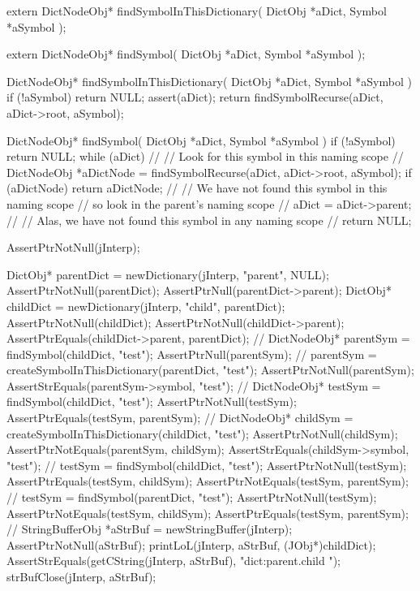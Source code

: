 \startTestSuite[findSymbol]

\startCHeader
extern DictNodeObj* findSymbolInThisDictionary(
  DictObj *aDict,
  Symbol  *aSymbol
);

extern DictNodeObj* findSymbol(
  DictObj *aDict,
  Symbol  *aSymbol
);
\stopCHeader
{}

\startCCode
DictNodeObj* findSymbolInThisDictionary(
  DictObj *aDict,
  Symbol  *aSymbol
) {
  if (!aSymbol) return NULL;
  assert(aDict);
  return findSymbolRecurse(aDict, aDict->root, aSymbol);
}

DictNodeObj* findSymbol(
  DictObj *aDict,
  Symbol  *aSymbol
) {
  if (!aSymbol) return NULL;
  while (aDict) {
    //
    // Look for this symbol in this naming scope
    //
    DictNodeObj *aDictNode = 
      findSymbolRecurse(aDict, aDict->root, aSymbol);
    if (aDictNode) return aDictNode;
    //
    // We have not found this symbol in this naming scope
    // so look in the parent's naming scope
    //
    aDict = aDict->parent;
  }
  //
  // Alas, we have not found this symbol in any naming scope
  //
  return NULL;
}
\stopCCode

\startCTest
  AssertPtrNotNull(jInterp);

  DictObj* parentDict = newDictionary(jInterp, "parent", NULL);
  AssertPtrNotNull(parentDict);
  AssertPtrNull(parentDict->parent);
  DictObj* childDict  = newDictionary(jInterp, "child", parentDict);
  AssertPtrNotNull(childDict);
  AssertPtrNotNull(childDict->parent);
  AssertPtrEquals(childDict->parent, parentDict);
  //
  DictNodeObj* parentSym = findSymbol(childDict, "test");
  AssertPtrNull(parentSym);
  //
  parentSym = 
    createSymbolInThisDictionary(parentDict, "test");
  AssertPtrNotNull(parentSym);
  AssertStrEquals(parentSym->symbol, "test");
  //
  DictNodeObj* testSym = findSymbol(childDict, "test");
  AssertPtrNotNull(testSym);
  AssertPtrEquals(testSym, parentSym);
  //
  DictNodeObj* childSym =
    createSymbolInThisDictionary(childDict, "test");
  AssertPtrNotNull(childSym);
  AssertPtrNotEquals(parentSym, childSym);
  AssertStrEquals(childSym->symbol, "test");
  //
  testSym = findSymbol(childDict, "test");
  AssertPtrNotNull(testSym);
  AssertPtrEquals(testSym, childSym);
  AssertPtrNotEquals(testSym, parentSym);
  //
  testSym = findSymbol(parentDict, "test");
  AssertPtrNotNull(testSym);
  AssertPtrNotEquals(testSym, childSym);
  AssertPtrEquals(testSym, parentSym);
  //
  StringBufferObj *aStrBuf = newStringBuffer(jInterp);
  AssertPtrNotNull(aStrBuf);
  printLoL(jInterp, aStrBuf, (JObj*)childDict);
  AssertStrEquals(getCString(jInterp, aStrBuf), "dict:parent.child ");
  strBufClose(jInterp, aStrBuf);  
\stopCTest
\stopTestCase
\stopTestSuite

